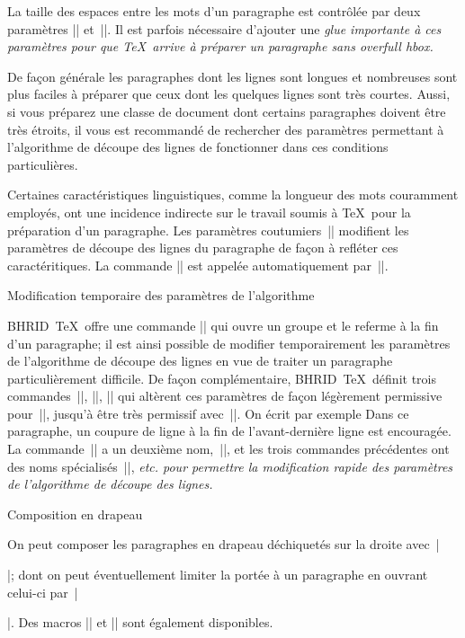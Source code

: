 La taille des espaces entre les mots d'un paragraphe est contrôlée par
deux paramètres |\spaceskip| et~|\xspaceskip|. Il est parfois
nécessaire d'ajouter une \em{glue} importante à ces paramètres pour
que \TeX\ arrive à préparer un paragraphe sans \em{overfull hbox}.

De façon générale les paragraphes dont les lignes sont longues et
nombreuses sont plus faciles à préparer que ceux dont les quelques
lignes sont très courtes. Aussi, si vous préparez une classe de
document dont certains paragraphes doivent être très étroits, il vous
est recommandé de rechercher des paramètres permettant à l'algorithme
de découpe des lignes de fonctionner dans ces conditions
particulières.

Certaines caractéristiques linguistiques, comme la longueur des mots
couramment employés, ont une incidence indirecte sur le travail soumis
à \TeX\ pour la préparation d'un paragraphe. Les paramètres
coutumiers~|\selectparagraph| modifient les paramètres de découpe des
lignes du paragraphe de façon à refléter ces caractéritiques. La
commande |\selectparagraph| est appelée automatiquement
par~|\selectlocale|.


\formalpar Modification temporaire des paramètres de l'algorithme

BHRID~\TeX\ offre une commande |\pargroup| qui ouvre un groupe et le
referme à la fin d'un paragraphe; il est ainsi possible de modifier
temporairement les paramètres de l'algorithme de découpe des lignes en
vue de traiter un paragraphe particulièrement difficile. De façon
complémentaire, BHRID~\TeX\ définit trois commandes~|\paragraphtricky|,
|\paragraphhard|, |\paragraphnasty| qui altèrent ces paramètres de
façon légèrement permissive pour~|\paragraphtricky|, jusqu'à être très
permissif avec~|\paragraphnasty|. On écrit par exemple
\begincode
\pargroup
{}
Dans ce paragraphe, un coupure de ligne à la fin de
l'avant-dernière ligne est encouragée.
\endcode
La commande~|\pargroup| a un deuxième nom,~|\thisparagraph|, et les
trois commandes précédentes ont des noms
spécialisés~|\thisparagraphtricky|, \em{etc.} pour permettre la
modification rapide des paramètres de l'algorithme de découpe des
lignes.


\formalpar Composition en drapeau

On peut composer les paragraphes en drapeau déchiquetés sur la droite
avec~|\raggedright|; dont on peut éventuellement limiter la portée à
un paragraphe en ouvrant celui-ci
par~|\thisparagraph\raggedright|. Des macros |\raggedleft| et
|\raggedboth| sont également disponibles.


